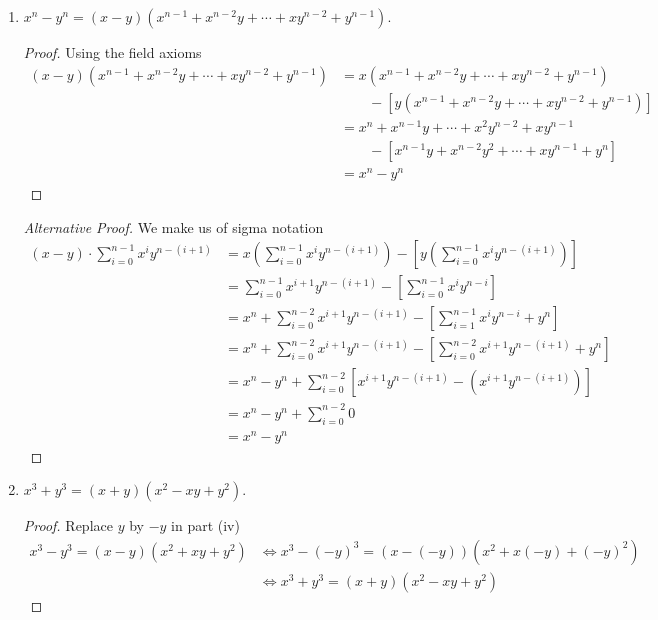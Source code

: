 \begin{exercise}[\textbf{1}]
\begin{enumerate}
\begin{proof}
\begin{align*}
                 (x-y)(x^2+xy+y^2) &= x^2(x-y)+xy(x-y)+y^2(x-y) \\
                 &= (x^3-x^2y)+(x^2y-xy^2)+(xy^2-y^3) \\
                 &= x^3+(x^2y-x^2y)+(xy^2-xy^2)-y^3 \\
                 &= x^3-y^3
             \end{align*}
        \end{proof}
        \item $x^n-y^n = (x-y)(x^{n-1}+x^{n-2}y+\dotsb +xy^{n-2}+y^{n-1}).$
        \begin{proof}Using the field axioms
             \begin{align*}
                 (x-y)(x^{n-1}+x^{n-2}y+\dotsb +xy^{n-2}+y^{n-1}) &= x(x^{n-1}+x^{n-2}y+\dotsb+xy^{n-2}+y^{n-1}) \\
                 & \qquad -[y(x^{n-1}+x^{n-2}y+\dotsb+xy^{n-2}+y^{n-1})] \\
                 &= x^n+x^{n-1}y+\dotsb+x^2y^{n-2}+xy^{n-1} \\
                 & \qquad -[x^{n-1}y+x^{n-2}y^2+\dotsb+xy^{n-1}+y^{n}] \\
                 &= x^n-y^n
             \end{align*}
        \end{proof}
        \begin{proof}[Alternative Proof] We make us of sigma notation
             \begin{align*}
                 (x-y)\cdot \sum_{i=0}^{n-1}x^iy^{n-(i+1)} &= x\left(\sum_{i=0}^{n-1}x^iy^{n-(i+1)}\right)- \left[y\left(\sum_{i=0}^{n-1}x^iy^{n-(i+1)}\right)\right] \\
                 &= \sum_{i=0}^{n-1}x^{i+1}y^{n-(i+1)} -\left[\sum_{i=0}^{n-1}x^iy^{n-i}\right] \\
                 &= x^n +\sum_{i=0}^{n-2}x^{i+1}y^{n-(i+1)} -\left[\sum_{i=1}^{n-1}x^iy^{n-i} +y^n\right] \\
                 &= x^n +\sum_{i=0}^{n-2}x^{i+1}y^{n-(i+1)} -\left[\sum_{i=0}^{n-2}x^{i+1}y^{n-(i+1)} +y^n\right] \\
                 &= x^n-y^n + \sum_{i=0}^{n-2} \left[x^{i+1}y^{n-(i+1)} - (x^{i+1}y^{n-(i+1)}) \right] \\
                 &= x^n-y^n +\sum_{i=0}^{n-2} 0 \\
                 &= x^n-y^n
             \end{align*}
        \end{proof}
        \item $x^3+y^3 = (x+y)(x^2-xy+y^2).$
        \begin{proof} Replace $y$ by $-y$ in part (iv)
             \begin{align*}
                x^3-y^3 = (x-y)(x^2+xy+y^2) & \Leftrightarrow x^3-(-y)^3 = (x-(-y))(x^2+x(-y)+(-y)^2) \\
                & \Leftrightarrow x^3+y^3 = (x+y)(x^2-xy+y^2)
             \end{align*}
        \end{proof}
    \end{enumerate}
\end{exercise}

